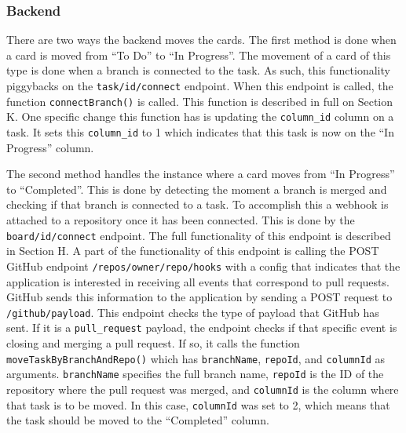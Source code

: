 \documentclass{article}
\def\code#1{\texttt{#1}}
\begin{document}
\subsubsection{Backend}
There are two ways the backend moves the cards. The first method is done when a
card is moved from “To Do” to “In Progress”. The movement of a card of this type
is done when a branch is connected to the task. As such, this functionality
piggybacks on the \code{task/{id}/connect} endpoint. When this endpoint is
called, the function \code{connectBranch()} is called. This function is
described in full on Section K. One specific change this function has is
updating the \code{column\_id} column on a task. It sets this \code{column\_id}
to 1 which indicates that this task is now on the “In Progress” column.

The second method handles the instance where a card moves from “In Progress” to
“Completed”. This is done by detecting the moment a branch is merged and
checking if that branch is connected to a task. To accomplish this a webhook is
attached to a repository once it has been connected. This is done by the
\code{board/{id}/connect} endpoint. The full functionality of this endpoint is
described in Section H. A part of the functionality of this endpoint is calling
the POST GitHub endpoint \code{/repos/{owner}/{repo}/hooks} with a config that
indicates that the application is interested in receiving all events that
correspond to pull requests. GitHub sends this information to the application by
sending a POST request to \code{/github/payload}. This endpoint checks the type
of payload that GitHub has sent. If it is a \code{pull\_request} payload, the
endpoint checks if that specific event is closing and merging a pull request. If
so, it calls the function \code{moveTaskByBranchAndRepo()} which has
\code{branchName}, \code{repoId}, and \code{columnId} as arguments.
\code{branchName} specifies the full branch name, \code{repoId} is the ID of the
repository where the pull request was merged, and \code{columnId} is the column
where that task is to be moved. In this case, \code{columnId} was set to 2,
which means that the task should be moved to the “Completed” column.
\end{document}

